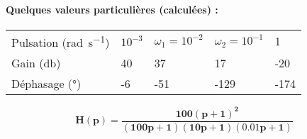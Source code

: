 \paragraph{Quelques valeurs particulières (calculées) :}
\begin{center}
\begin{tabular}{P{3.5cm}P{2cm}P{2cm}P{2cm}P{2cm}}
\hline
\hline
Pulsation (\si{\radian\per\second}) 
& $10^{-3}$ & $\omega_1=10^{-2}$ & $\omega_2=10^{-1}$ &     1  \\[1em]
Gain (\si{\decibel})       
&   40      &    37              &    17              &   -20  \\[1em]
Déphasage (\si{\degree})   
&  -6       &   -51              &  -129              &  -174  \\[1em]
\hline
\hline
\end{tabular}
\end{center}
\newpage
\question{}
\[
\boldsymbol{H(p) = \dfrac{100(p+1)^2}{(100p+1)(10p+1)(0.01p+1)}}
\]
